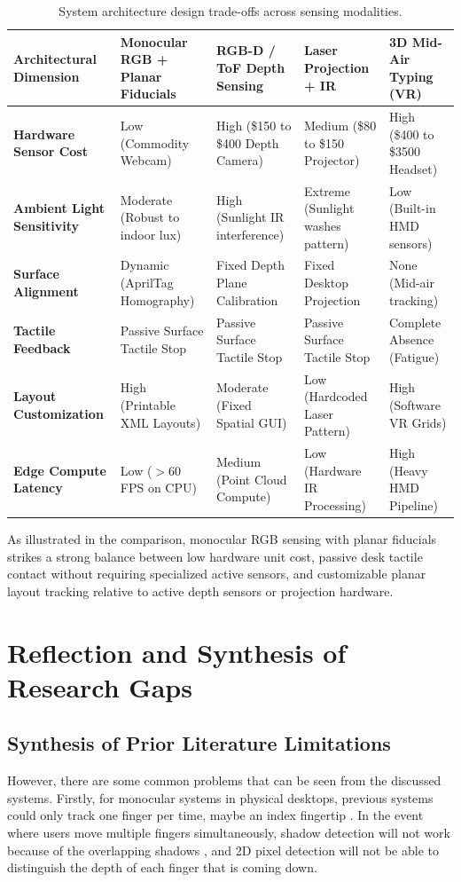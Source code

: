 \begin{table}[htbp]
\centering
\caption{System architecture design trade-offs across sensing modalities.}
\label{tab:lit_sensing_tradeoffs}
\begin{tabular}{l l l l l}
\toprule
\textbf{Architectural Dimension} & \textbf{Monocular RGB + Planar Fiducials} & \textbf{RGB-D / ToF Depth Sensing} & \textbf{Laser Projection + IR} & \textbf{3D Mid-Air Typing (VR)} \\
\midrule
\textbf{Hardware Sensor Cost} & Low (Commodity Webcam) & High (\$150 to \$400 Depth Camera) & Medium (\$80 to \$150 Projector) & High (\$400 to \$3500 Headset) \\
\textbf{Ambient Light Sensitivity} & Moderate (Robust to indoor lux) & High (Sunlight IR interference) & Extreme (Sunlight washes pattern) & Low (Built-in HMD sensors) \\
\textbf{Surface Alignment} & Dynamic (AprilTag Homography) & Fixed Depth Plane Calibration & Fixed Desktop Projection & None (Mid-air tracking) \\
\textbf{Tactile Feedback} & Passive Surface Tactile Stop & Passive Surface Tactile Stop & Passive Surface Tactile Stop & Complete Absence (Fatigue) \\
\textbf{Layout Customization} & High (Printable XML Layouts) & Moderate (Fixed Spatial GUI) & Low (Hardcoded Laser Pattern) & High (Software VR Grids) \\
\textbf{Edge Compute Latency} & Low ($> 60$ FPS on CPU) & Medium (Point Cloud Compute) & Low (Hardware IR Processing) & High (Heavy HMD Pipeline) \\
\bottomrule
\end{tabular}%
\end{table}

As illustrated in the comparison, monocular RGB sensing with planar fiducials strikes a strong balance between low hardware unit cost, passive desk tactile contact without requiring specialized active sensors, and customizable planar layout tracking relative to active depth sensors or projection hardware.

\section{Reflection and Synthesis of Research Gaps}
\label{sec:lit_reflection}

\subsection{Synthesis of Prior Literature Limitations}
\label{subsec:lit_synthesis_limitations}
However, there are some common problems that can be seen from the discussed systems. Firstly, for monocular systems in physical desktops, previous systems could only track one finger per time, maybe an index fingertip \cite{Zhang2001Visual, Srivastava2012RealTime, Posner2012Single, Thomas2013Camera, Ji2018Local, Khare2019QWERTY}. In the event where users move multiple fingers simultaneously, shadow detection will not work because of the overlapping shadows \cite{Posner2012Single, Yue2014Blind}, and 2D pixel detection will not be able to distinguish the depth of each finger that is coming down.

